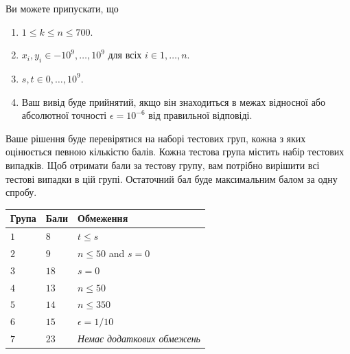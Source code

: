Ви можете припускати, що
\begin{enumerate}
\item $1\leq k\leq n\leq 700$. %
\item $x_i, y_i\in {-10^9,\ldots, 10^9}$ для всіх $i\in{1,\ldots,n}$. %
\item $s,t\in {0,\ldots, 10^9}$. %
\item Ваш вивід буде прийнятий, якщо він знаходиться в межах відносної або абсолютної точності $\epsilon = 10^{-6}$ від правильної відповіді.
\end{enumerate}


Ваше рішення буде перевірятися на наборі тестових груп, кожна з яких оцінюється певною кількістю балів.
Кожна тестова група містить набір тестових випадків.
Щоб отримати бали за тестову групу, вам потрібно вирішити всі тестові випадки в цій групі.
Остаточний бал буде максимальним балом за одну спробу.

\medskip
\noindent
\begin{tabular}{lll}
  Група & Бали & Обмеження\\\hline
  $1$ & $8$ &  $t\leq s$\\
  $2$ & $9$ & $n\le 50$ and $s=0$\\
  $3$ & $18$ & $s=0$\\
  $4$ & $13$ & $n\leq 50$\\
  $5$ & $14$ & $n\leq 350$\\
  $6$ & $15$ & $\epsilon = 1/10$\\
  $7$ & $23$ & \emph{Немає додаткових обмежень}\\
\end{tabular}




